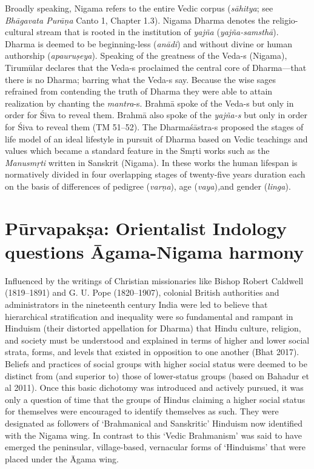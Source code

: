 Broadly speaking, Nigama refers to the entire Vedic corpus (\textit{sāhitya}; see \textit{Bhāgavata Purāṇa} Canto 1, Chapter 1.3). Nigama Dharma denotes the religio-cultural stream that is rooted in the institution of \textit{yajña} (\textit{yajña-samsthā}). Dharma is deemed to be beginning-less (\textit{anādi}) and without divine or human authorship (\textit{apauruṣeya}). Speaking of the greatness of the Veda-s (Nigama), Tirumūlar declares that the Veda-s proclaimed the central core of Dharma—that there is no Dharma; barring what the Veda-s say. Because the wise sages refrained from contending the truth of Dharma they were able to attain realization by chanting the \textit{mantra}-s. Brahmā spoke of the Veda-s but only in order for Śiva to reveal them. Brahmā also spoke of the \textit{yajña-s} but only in order for Śiva to reveal them (TM 51–52). The Dharmaśāstra-s proposed the stages of life model of an ideal lifestyle in pursuit of Dharma based on Vedic teachings and values which became a standard feature in the Smṛti works such as the \textit{Manusmṛti}  written in Sanskrit (Nigama). In these works the human lifespan is normatively divided in four overlapping stages of twenty-five years duration each on the basis of differences of pedigree (\textit{varṇa}), age (\textit{vaya})\textit{,}and gender (\textit{linga}).


\section*{Pūrvapakṣa: Orientalist Indology questions Āgama-Nigama harmony}

\vskip  4pt

Influenced by the writings of Christian missionaries like Bishop Robert Caldwell (1819–1891) and G. U. Pope (1820–1907), colonial British authorities and administrators in the nineteenth century India were led to believe that hierarchical stratification and inequality were so fundamental and rampant in Hinduism (their distorted appellation for Dharma) that Hindu culture, religion, and society must be understood and explained in terms of higher and lower social strata, forms, and levels that existed in opposition to one another (Bhat 2017). Beliefs and practices of social groups with higher social status were deemed to be distinct from (and superior to) those of lower-status groups (based on Bahadur et al 2011). Once this basic dichotomy was introduced and actively pursued, it was only a question of time that the groups of Hindus claiming a higher social status for themselves were encouraged to identify themselves as such. They were designated as followers of ‘Brahmanical and Sanskritic’ Hinduism now identified with the Nigama wing. In contrast to this ‘Vedic Brahmanism’ was said to have emerged the peninsular, village-based, vernacular forms of ‘Hinduisms’ that were placed under the Āgama wing.

